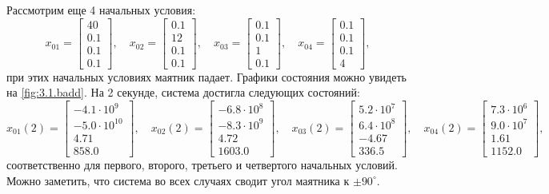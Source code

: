 \noindent Рассмотрим еще 4 начальных условия:
\begin{equation*}
    x_{01}=\begin{bmatrix}
        40\\
        0.1\\
        0.1\\
        0.1
    \end{bmatrix},\quad
    x_{02}=\begin{bmatrix}
        0.1\\
         12\\
        0.1\\
         0.1
    \end{bmatrix},\quad
    x_{03}=\begin{bmatrix}
        0.1\\
         0.1\\
         1\\
         0.1
    \end{bmatrix},\quad
    x_{04}=\begin{bmatrix}
        0.1\\
         0.1\\
         0.1\\
         4
    \end{bmatrix},
\end{equation*}
при этих начальных условиях маятник падает. 
Графики состояния можно увидеть на \autoref{fig:3.1.badd}.
На 2 секунде, система достигла следующих состояний:
\begin{equation*}
    x_{01}(2)=\begin{bmatrix}
-4.1\cdot10^9 \\ -5.0\cdot10^{10} \\ 4.71 \\ 858.0
\end{bmatrix},\quad
    x_{02}(2)=\begin{bmatrix}
-6.8\cdot10^8 \\ -8.3\cdot10^9 \\ 4.72 \\ 1603.0
\end{bmatrix},\quad
    x_{03}(2)=\begin{bmatrix}
5.2\cdot10^7 \\ 6.4\cdot10^8 \\ -4.67 \\ 336.5
\end{bmatrix},\quad
    x_{04}(2)=\begin{bmatrix}
7.3\cdot10^6 \\ 9.0\cdot10^7 \\ 1.61 \\ 1152.0
\end{bmatrix},
\end{equation*}
соответственно для первого, второго, третьего и четвертого начальных условий.
Можно заметить, что система во всех случаях сводит угол маятника к $\pm90^\circ$.

